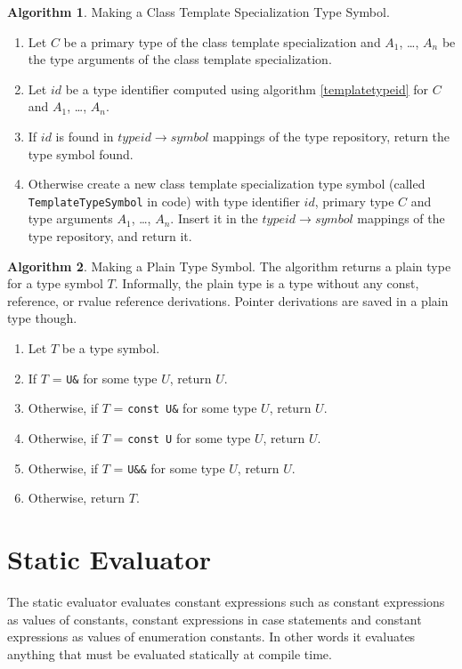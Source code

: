 \documentclass[a4paper,oneside,11pt]{book}
\theoremstyle{definition}
\newtheorem{algo}{Algorithm}[section]
\begin{document}
\begin{algo}\label{maketemplatetype} Making a Class Template Specialization Type Symbol.
\begin{enumerate}
\item
Let $C$ be a primary type of the class template specialization and $A_1$, \ldots, $A_n$ be the type arguments of the class template specialization.
\item
Let $id$ be a type identifier computed using algorithm \ref{templatetypeid} for $C$ and $A_1$, \ldots, $A_n$.
\item
If $id$ is found in $type id \rightarrow symbol$ mappings of the type repository, return the type symbol found.
\item
Otherwise create a new class template specialization type symbol (called \verb|TemplateTypeSymbol| in code)
with type identifier $id$, primary type $C$ and type arguments $A_1$, \ldots, $A_n$.
Insert it in the $type id \rightarrow symbol$ mappings of the type repository, and return it.
\end{enumerate}
\end{algo}

\begin{algo}\label{makeplaintype} Making a Plain Type Symbol.
The algorithm returns a plain type for a type symbol $T$.
Informally, the plain type is a type without any const, reference, or rvalue reference derivations.
Pointer derivations are saved in a plain type though.
\begin{enumerate}
\item
Let $T$ be a type symbol.
\item
If $T$ = \verb|U&| for some type $U$, return $U$.
\item
Otherwise, if $T$ = \verb|const U&| for some type $U$, return $U$.
\item
Otherwise, if $T$ = \verb|const U| for some type $U$, return $U$.
\item
Otherwise, if $T$ = \verb|U&&| for some type $U$, return $U$.
\item
Otherwise, return $T$.
\end{enumerate}
\end{algo}

\chapter{Static Evaluator}\label{evaluator}

The static evaluator evaluates constant expressions such as constant expressions as values of constants,
constant expressions in case statements and constant expressions as values of enumeration constants.
In other words it evaluates anything that must be evaluated statically at compile time.
\end{document}
